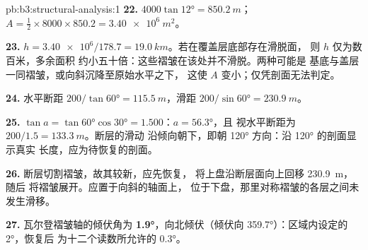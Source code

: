 \begin{solution}{pb:b3:structural-analysis:1}
\textbf{22.} $4000\tan\ang{12} = \qty{850.2}{m}$；$A = \tfrac12\times8000\times
850.2 = \qty{3.40e6}{m^2}$。

\textbf{23.} $h = \num{3.40e6}/178.7 = \qty{19.0}{km}$。若在覆盖层底部存在滑脱面，
则 $h$ 仅为数百米，多余面积
约小五十倍：这些褶皱在该处并不滑脱。两种可能是
基底与盖层一同褶皱，或向斜沉降至原始水平之下，
这使 $A$ 变小；仅凭剖面无法判定。

\textbf{24.} 水平断距 $200/\tan\ang{60} = \qty{115.5}{m}$，滑距 $200/\sin\ang{60}
= \qty{230.9}{m}$。

\textbf{25.} $\tan a = \tan\ang{60}\cos\ang{30} = 1.500$：$a = \ang{56.3}$，且
视水平断距为 $200/1.5 = \qty{133.3}{m}$。断层的滑动
沿倾向朝下，即朝 \ang{120} 方向：沿 \ang{120} 的剖面显示真实
长度，应为待恢复的剖面。

\textbf{26.} 断层切割褶皱，故其较新，应先恢复，
将上盘沿断层面向上回移 \qty{230.9}{m}，随后
将褶皱展开。应置于向斜的轴面上，
位于下盘，那里对称褶皱的各层之间未发生滑移。

\textbf{27.} 瓦尔登褶皱轴的倾伏角为
\textbf{\ang[text-series-to-math=true]{1.9}}，向北倾伏（倾伏向
\ang{359.7}）：区域内设定的 \ang{2}，恢复后
为十二个读数所允许的 \ang{0.3}。
\end{solution}
